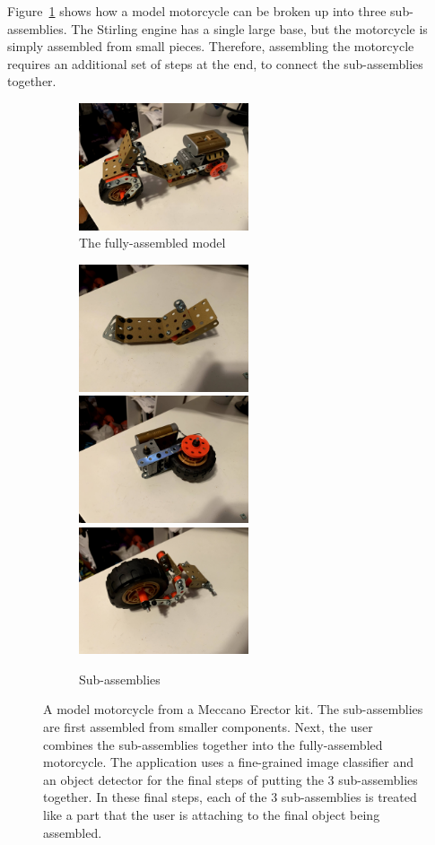 Figure~\ref{fig:erector} shows how a model motorcycle can be broken up into
three sub-assemblies.
The Stirling engine has a single large base, but the motorcycle is simply
assembled from small pieces. Therefore, assembling the motorcycle requires
an additional set of steps at the end, to connect the sub-assemblies together.

\begin{figure}
  \begin{subfigure}{\textwidth}
    \includegraphics[width=5cm]{figures/erector/full.jpg}
    \caption{The fully-assembled model}
  \end{subfigure}
  \begin{subfigure}{\textwidth}
    \includegraphics[width=5cm]{figures/erector/sub1.jpg}
    \includegraphics[width=5cm]{figures/erector/sub2.jpg}
    \includegraphics[width=5cm]{figures/erector/sub3.jpg}
    \caption{Sub-assemblies}
  \end{subfigure}
  \caption{A model motorcycle from a Meccano Erector kit.
    The sub-assemblies are first assembled from smaller components.
    Next, the user combines the sub-assemblies together into the fully-assembled
    motorcycle.
    The application uses a fine-grained image classifier and an object detector
    for the final steps of putting the 3 sub-assemblies together.
    In these final steps, each of the 3 sub-assemblies is treated like a part
    that the user is attaching to the final object being assembled.
  }\label{fig:erector}
\end{figure}

